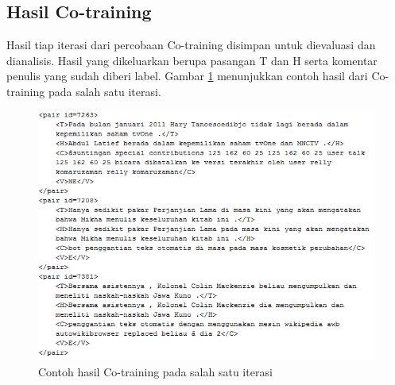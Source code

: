 \subsection{Hasil Co-training}
Hasil tiap iterasi dari percobaan Co-training disimpan untuk dievaluasi dan dianalisis. Hasil yang dikeluarkan berupa pasangan T dan H serta komentar penulis yang sudah diberi label. Gambar \ref{fig:hasil-cotrain} menunjukkan contoh hasil dari Co-training pada salah satu iterasi.
\begin{figure}
	\centering
	\includegraphics[width=1\linewidth]{pics/hasil-cotrain}
	\caption{Contoh hasil Co-training pada salah satu iterasi}
	\label{fig:hasil-cotrain}
\end{figure}

